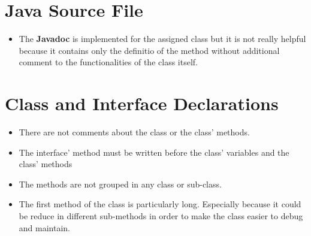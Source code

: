\section{Java Source File}
\begin{itemize}
    \begin{itemize}
      \item The \textbf{Javadoc} is implemented for the assigned class but it is not really helpful because
        it contains only the definitio of the method without additional comment to the functionalities of the class itself.
    \end{itemize}
\end{itemize}
\section{Class and Interface Declarations}
\begin{itemize}
    \begin{itemize}
      \item There are not comments about the class or the class' methods.
    \end{itemize}
    \begin{itemize}
      \item The interface' method
      must be written before the class' variables and the class' methods
    \end{itemize}
    \begin{itemize}
      \item The methods are not grouped in any class or sub-class.
    \end{itemize}
    \begin{itemize}
      \item The first method of the class
        is particularly long. Especially because it could be reduce in different sub-methods in order to make the class
        easier to debug and maintain.
    \end{itemize}
\end{itemize}
